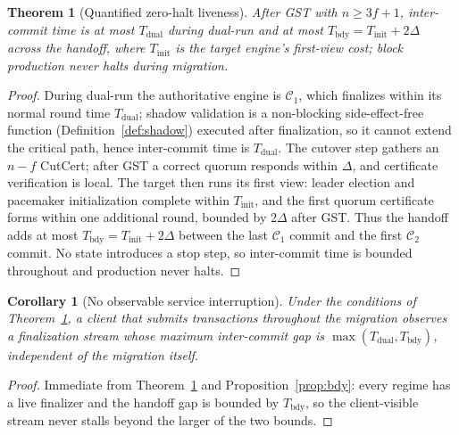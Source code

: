 \documentclass[journal]{IEEEtran}
\newtheorem{theorem}{Theorem}
\newtheorem{corollary}{Corollary}
\begin{document}
\begin{theorem}[Quantified zero-halt liveness]
\label{th:liveness}
After GST with $n\ge 3f+1$, inter-commit time is at most $T_{\mathrm{dual}}$ during dual-run
and at most $T_{\mathrm{bdy}} = T_{\mathrm{init}} + 2\Delta$ across the handoff, where
$T_{\mathrm{init}}$ is the target engine's first-view cost; block production never halts during
migration.
\end{theorem}
\begin{proof}
During dual-run the authoritative engine is $\mathcal{C}_1$, which finalizes within its normal
round time $T_{\mathrm{dual}}$; shadow validation is a non-blocking side-effect-free function
(Definition~\ref{def:shadow}) executed after finalization, so it cannot extend the critical
path, hence inter-commit time is $T_{\mathrm{dual}}$. The cutover step gathers an $n-f$ CutCert;
after GST a correct quorum responds within $\Delta$, and certificate verification is local. The
target then runs its first view: leader election and pacemaker initialization complete within
$T_{\mathrm{init}}$, and the first quorum certificate forms within one additional round, bounded
by $2\Delta$ after GST. Thus the handoff adds at most $T_{\mathrm{bdy}}=T_{\mathrm{init}}+2\Delta$
between the last $\mathcal{C}_1$ commit and the first $\mathcal{C}_2$ commit. No state introduces
a stop step, so inter-commit time is bounded throughout and production never halts.
\end{proof}

\begin{corollary}[No observable service interruption]
\label{cor:nohalt}
Under the conditions of Theorem~\ref{th:liveness}, a client that submits transactions throughout
the migration observes a finalization stream whose maximum inter-commit gap is
$\max(T_{\mathrm{dual}}, T_{\mathrm{bdy}})$, independent of the migration itself.
\end{corollary}
\begin{proof}
Immediate from Theorem~\ref{th:liveness} and Proposition~\ref{prop:bdy}: every regime has a live
finalizer and the handoff gap is bounded by $T_{\mathrm{bdy}}$, so the client-visible stream
never stalls beyond the larger of the two bounds.
\end{proof}
\end{document}
